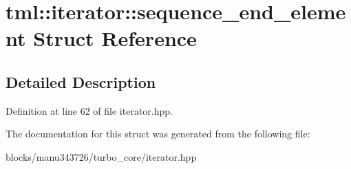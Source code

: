 \hypertarget{structtml_1_1iterator_1_1sequence__end__element}{\section{tml\+:\+:iterator\+:\+:sequence\+\_\+end\+\_\+element Struct Reference}
\label{structtml_1_1iterator_1_1sequence__end__element}
}


\subsection{Detailed Description}


Definition at line 62 of file iterator.\+hpp.



The documentation for this struct was generated from the following file\+:\begin{DoxyCompactItemize}
\item 
blocks/manu343726/turbo\+\_\+core/iterator.\+hpp\end{DoxyCompactItemize}
